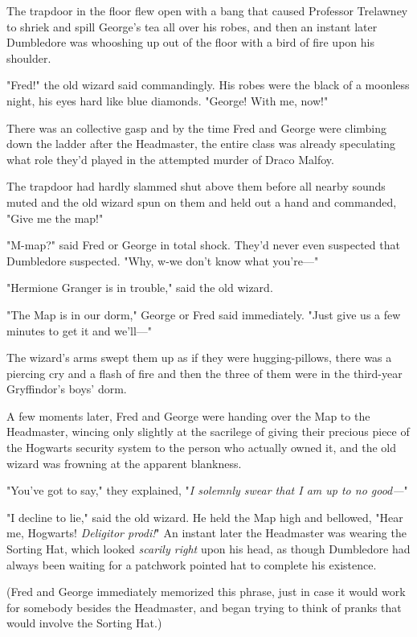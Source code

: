 The trapdoor in the floor flew open with a bang that caused Professor Trelawney to shriek and spill George's tea all over his robes, and then an instant later Dumbledore was whooshing up out of the floor with a bird of fire upon his shoulder.

"Fred!" the old wizard said commandingly. His robes were the black of a moonless night, his eyes hard like blue diamonds. "George! With me, now!"

There was an collective gasp and by the time Fred and George were climbing down the ladder after the Headmaster, the entire class was already speculating what role they'd played in the attempted murder of Draco Malfoy.

The trapdoor had hardly slammed shut above them before all nearby sounds muted and the old wizard spun on them and held out a hand and commanded, "Give me the map!"

"M-map?" said Fred or George in total shock. They'd never even suspected that Dumbledore suspected. "Why, w-we don't know what you're---"

"Hermione Granger is in trouble," said the old wizard.

"The Map is in our dorm," George or Fred said immediately. "Just give us a few minutes to get it and we'll---"

The wizard's arms swept them up as if they were hugging-pillows, there was a piercing cry and a flash of fire and then the three of them were in the third-year Gryffindor's boys' dorm.

A few moments later, Fred and George were handing over the Map to the Headmaster, wincing only slightly at the sacrilege of giving their precious piece of the Hogwarts security system to the person who actually owned it, and the old wizard was frowning at the apparent blankness.

"You've got to say," they explained, "\emph{I solemnly swear that I am up to no good---}"

"I decline to lie," said the old wizard. He held the Map high and bellowed, "Hear me, Hogwarts! \emph{Deligitor prodi!}" An instant later the Headmaster was wearing the Sorting Hat, which looked \emph{scarily right} upon his head, as though Dumbledore had always been waiting for a patchwork pointed hat to complete his existence.

(Fred and George immediately memorized this phrase, just in case it would work for somebody besides the Headmaster, and began trying to think of pranks that would involve the Sorting Hat.)

